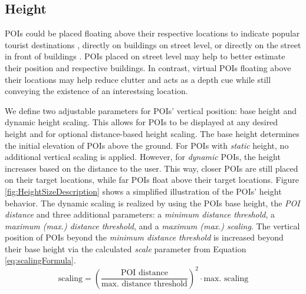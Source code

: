 \subsection{Height}
\label{sec:system_height}
POIs could be placed floating above their respective locations to indicate popular tourist destinations \cite{Lee24SituatedVisAR}, directly on buildings on street level, or directly on the street in front of buildings \cite{Ghaemi23ARPlacement}. POIs placed on street level may help to better estimate their position and respective buildings. In contrast, virtual POIs floating above their locations may help reduce clutter and acts as a depth cue while still conveying the existence of an interestsing location.

We define two adjustable parameters for POIs' vertical position: base height and dynamic height scaling. This allows for POIs to be displayed at any desired height and for optional distance-based height scaling. The base height determines the initial elevation of POIs above the ground. For POIs with \textit{static} height, no additional vertical scaling is applied. However, for \textit{dynamic} POIs, the height increases based on the distance to the user. This way, closer POIs are still placed on their target locations, while far POIs float above their target locations. Figure \ref{fig:HeightSizeDescription} shows a simplified illustration of the POIs' height behavior. The dynamic scaling is realized by using the POIs base height, the \textit{POI distance} and three additional parameters: a \textit{minimum distance threshold}, a \textit{maximum (max.) distance threshold}, and a \textit{maximum (max.) scaling}. The vertical position of POIs beyond the \textit{minimum distance threshold} is increased beyond their base height via the calculated \textit{scale} parameter from Equation \ref{eq:scalingFormula}.
\begin{equation} 
    \label{eq:scalingFormula}
        \text{scaling} = \left(\frac{\text{POI distance}}{\text{max. distance threshold}}\right)^2\cdot\text{max. scaling}
\end{equation}

